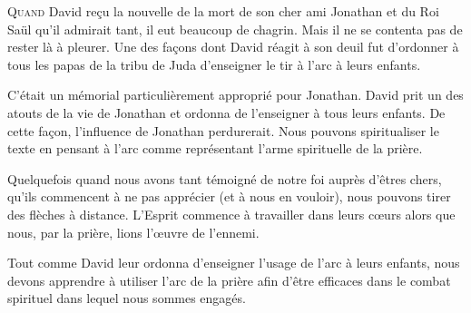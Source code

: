 \jrnlmonth




\lettrine{Q}{uand} David re\c{c}u la nouvelle de la mort
 de son cher ami Jonathan et du Roi Saül qu'il admirait tant,
 il eut beaucoup de chagrin. Mais il ne se contenta pas de rester
 là à pleurer.
 Une des fa\c{c}ons dont David réagit à son deuil fut d'ordonner
 à tous les papas de la tribu de Juda d'enseigner le tir à l'arc
 à leurs enfants.

C'était un mémorial particulièrement approprié pour Jonathan.
 David prit un des atouts de la vie de Jonathan et ordonna
 de l'enseigner à tous leurs enfants. De cette fa\c{c}on,
 l'influence de Jonathan perdurerait.
 Nous pouvons spiritualiser le texte en pensant à l'arc
 comme représentant l'arme spirituelle de la prière.


Quelquefois quand nous avons tant témoigné de notre foi auprès d'êtres chers,
 qu'ils commencent à ne pas apprécier (et à nous en vouloir),
 nous pouvons tirer des flèches à distance.
 L'Esprit commence à travailler dans leurs c\oe{}urs alors que nous,
 par la prière, lions l'\oe{}uvre de l'ennemi.

Tout comme David leur ordonna d'enseigner l'usage de l'arc à leurs enfants,
 nous devons apprendre à utiliser l'arc de la prière afin d'être efficaces
 dans le combat spirituel dans lequel nous sommes engagés. 

\dvrule






